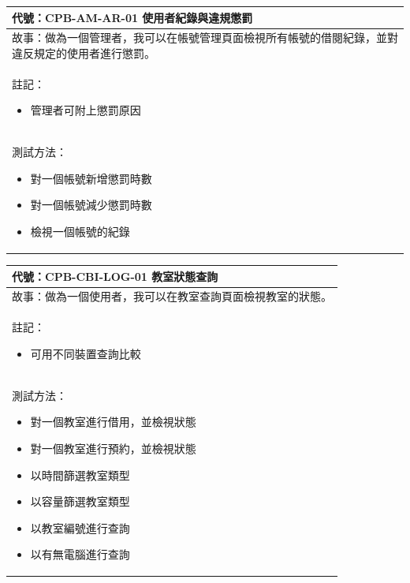 \documentclass{article}
\begin{document}
\begin{table}[H]
	\begin{tabular}{| m{13cm} |}
		\hline
		代號：CPB-AM-AR-01	使用者紀錄與違規懲罰                       \\ \hline
		故事：做為一個管理者，我可以在帳號管理頁面檢視所有帳號的借閱紀錄，並對違反規定的使用者進行懲罰。 \\	\hline
		註記：
		\begin{itemize}
			\item 管理者可附上懲罰原因
		\end{itemize}                                  \\ \hline
		測試方法：
		\begin{itemize}
			\item 對一個帳號新增懲罰時數
			\item 對一個帳號減少懲罰時數
			\item 檢視一個帳號的紀錄
		\end{itemize}
		\\	\hline
	\end{tabular}
\end{table}

\begin{table}[H]
	\begin{tabular}{| m{13cm} |}
		\hline
		代號：CPB-CBI-LOG-01	教室狀態查詢      \\ \hline
		故事：做為一個使用者，我可以在教室查詢頁面檢視教室的狀態。 \\	\hline
		註記：
		\begin{itemize}
			\item 可用不同裝置查詢比較
		\end{itemize}               \\ \hline
		測試方法：
		\begin{itemize}
			\item 對一個教室進行借用，並檢視狀態
			\item 對一個教室進行預約，並檢視狀態
			\item 以時間篩選教室類型
			\item 以容量篩選教室類型
			\item 以教室編號進行查詢
			\item 以有無電腦進行查詢
		\end{itemize}
		\\	\hline
	\end{tabular}
\end{table}
\end{document}
